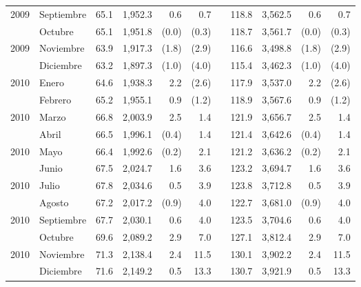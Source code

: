 \begin{center}
\begin{longtable}{llrrrrrrrrr}
		\multicolumn{1}{l}{	2009	}&	Septiembre	&	 65.1 	&	 1,952.3 	&	 0.6 	&	 0.7 	&  &	 118.8 	&	 3,562.5 	&	 0.6 	&	 0.7 	\\
		\rowcolor{color1!5!white}\multicolumn{1}{l}{	2009	}&	Octubre	&	 65.1 	&	 1,951.8 	&	 (0.0)	&	 (0.3)	&  &	 118.7 	&	 3,561.7 	&	 (0.0)	&	 (0.3)	\\
		\multicolumn{1}{l}{	2009	}&	Noviembre	&	 63.9 	&	 1,917.3 	&	 (1.8)	&	 (2.9)	&  &	 116.6 	&	 3,498.8 	&	 (1.8)	&	 (2.9)	\\
		\rowcolor{color1!5!white}\multicolumn{1}{l}{	2009	}&	Diciembre	&	 63.2 	&	 1,897.3 	&	 (1.0)	&	 (4.0)	&  &	 115.4 	&	 3,462.3 	&	 (1.0)	&	 (4.0)	\\
		\multicolumn{1}{l}{	2010	}&	Enero	&	 64.6 	&	 1,938.3 	&	 2.2 	&	 (2.6)	&  &	 117.9 	&	 3,537.0 	&	 2.2 	&	 (2.6)	\\
		\rowcolor{color1!5!white}\multicolumn{1}{l}{	2010	}&	Febrero	&	 65.2 	&	 1,955.1 	&	 0.9 	&	 (1.2)	&  &	 118.9 	&	 3,567.6 	&	 0.9 	&	 (1.2)	\\
		\multicolumn{1}{l}{	2010	}&	Marzo	&	 66.8 	&	 2,003.9 	&	 2.5 	&	 1.4 	&  &	 121.9 	&	 3,656.7 	&	 2.5 	&	 1.4 	\\
		\rowcolor{color1!5!white}\multicolumn{1}{l}{	2010	}&	Abril	&	 66.5 	&	 1,996.1 	&	 (0.4)	&	 1.4 	&  &	 121.4 	&	 3,642.6 	&	 (0.4)	&	 1.4 	\\
		\multicolumn{1}{l}{	2010	}&	Mayo	&	 66.4 	&	 1,992.6 	&	 (0.2)	&	 2.1 	&  &	 121.2 	&	 3,636.2 	&	 (0.2)	&	 2.1 	\\
		\rowcolor{color1!5!white}\multicolumn{1}{l}{	2010	}&	Junio	&	 67.5 	&	 2,024.7 	&	 1.6 	&	 3.6 	&  &	 123.2 	&	 3,694.7 	&	 1.6 	&	 3.6 	\\
		\multicolumn{1}{l}{	2010	}&	Julio	&	 67.8 	&	 2,034.6 	&	 0.5 	&	 3.9 	&  &	 123.8 	&	 3,712.8 	&	 0.5 	&	 3.9 	\\
		\rowcolor{color1!5!white}\multicolumn{1}{l}{	2010	}&	Agosto	&	 67.2 	&	 2,017.2 	&	 (0.9)	&	 4.0 	&  &	 122.7 	&	 3,681.0 	&	 (0.9)	&	 4.0 	\\
		\multicolumn{1}{l}{	2010	}&	Septiembre	&	 67.7 	&	 2,030.1 	&	 0.6 	&	 4.0 	&  &	 123.5 	&	 3,704.6 	&	 0.6 	&	 4.0 	\\
		\rowcolor{color1!5!white}\multicolumn{1}{l}{	2010	}&	Octubre	&	 69.6 	&	 2,089.2 	&	 2.9 	&	 7.0 	&  &	 127.1 	&	 3,812.4 	&	 2.9 	&	 7.0 	\\
		\multicolumn{1}{l}{	2010	}&	Noviembre	&	 71.3 	&	 2,138.4 	&	 2.4 	&	 11.5 	&  &	 130.1 	&	 3,902.2 	&	 2.4 	&	 11.5 	\\
		\rowcolor{color1!5!white}\multicolumn{1}{l}{	2010	}&	Diciembre	&	 71.6 	&	 2,149.2 	&	 0.5 	&	 13.3 	&  &	 130.7 	&	 3,921.9 	&	 0.5 	&	 13.3 	\\

\end{longtable}
\end{center}
